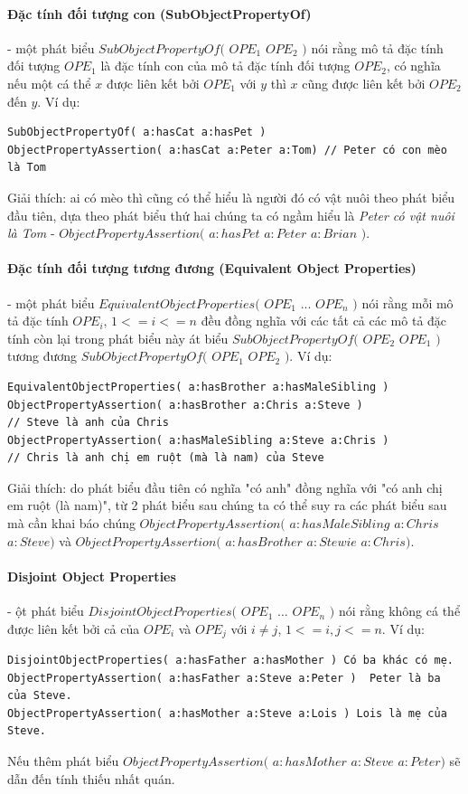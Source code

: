 \paragraph{Đặc tính đối tượng con (SubObjectPropertyOf)} - một phát biểu $SubObjectPropertyOf($ $OPE_{1}$ $OPE_{2}$ $)$ nói rằng mô tả đặc tính đối tượng $OPE_{1}$ là đặc tính con của mô tả đặc tính đối tượng $OPE_{2}$, có nghĩa nếu một cá thể $x$ được liên kết bởi $OPE_{1}$ với $y$ thì $x$ cũng được liên kết bởi $OPE_{2}$ đến $y$. Ví dụ:
\begin{verbatim}
SubObjectPropertyOf( a:hasCat a:hasPet )     
ObjectPropertyAssertion( a:hasCat a:Peter a:Tom) // Peter có con mèo là Tom
\end{verbatim}
Giải thích: ai có mèo thì cũng có thể hiểu là người đó có vật nuôi theo phát biểu đầu tiên, dựa theo phát biểu thứ hai chúng ta có ngầm hiểu là \textit{Peter có vật nuôi là Tom} - $ObjectPropertyAssertion($ $a:hasPet$ $a:Peter$ $a:Brian$ $)$.

\paragraph{Đặc tính đối tượng tương đương (Equivalent Object Properties)} - một phát biểu $EquivalentObjectProperties($ $OPE_{1}$ ... $OPE_{n}$ $)$ nói rằng mỗi mô tả đặc tính $OPE_{i}$, $1<=i<=n$ đều đồng nghĩa với các tất cả các mô tả đặc tính còn lại trong phát biểu này át biểu $SubObjectPropertyOf($ $OPE_{2}$ $OPE_{1}$ $)$ tương đương $SubObjectPropertyOf($ $OPE_{1}$ $OPE_{2}$ $)$. Ví dụ:
\begin{verbatim}
EquivalentObjectProperties( a:hasBrother a:hasMaleSibling ) 
ObjectPropertyAssertion( a:hasBrother a:Chris a:Steve )     
// Steve là anh của Chris
ObjectPropertyAssertion( a:hasMaleSibling a:Steve a:Chris ) 
// Chris là anh chị em ruột (mà là nam) của Steve
\end{verbatim}
Giải thích: do phát biểu đầu tiên có nghĩa "có anh" đồng nghĩa với "có anh chị em ruột (là nam)", từ 2 phát biểu sau chúng ta có thể suy ra các phát biểu sau mà cần khai báo chúng $ObjectPropertyAssertion($ $a:hasMaleSibling$ $a:Chris$ $a:Steve)$ và $ObjectPropertyAssertion($ $a:hasBrother$ $a:Stewie$ $a:Chris)$.

\paragraph{Disjoint Object Properties} - ột phát biểu $DisjointObjectProperties($ $OPE_{1}$ ... $OPE_{n}$ $)$ nói rằng không cá thể được liên kết bởi cả của $OPE_{i}$ và $OPE_{j}$ với $i \neq j$, $1<=i,j<=n$. Ví dụ:
\begin{verbatim}
DisjointObjectProperties( a:hasFather a:hasMother ) Có ba khác có mẹ.
ObjectPropertyAssertion( a:hasFather a:Steve a:Peter )	Peter là ba của Steve.
ObjectPropertyAssertion( a:hasMother a:Steve a:Lois ) Lois là mẹ của Steve.
\end{verbatim}
Nếu thêm phát biểu $ObjectPropertyAssertion($ $a:hasMother$ $a:Steve$ $a:Peter)$ sẽ dẫn đến tính thiếu nhất quán.

